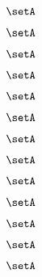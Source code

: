 \begin{forslides}
    \begin{equation}
        \label{eq:slides-processes-96}
        \setA
    \end{equation}

    \begin{equation}
        \label{eq:slides-processes-97}
        \setA
    \end{equation}

    \begin{equation}
        \label{eq:slides-processes-98}
        \setA
    \end{equation}

    \begin{equation}
        \label{eq:slides-processes-99}
        \setA
    \end{equation}
    
    \begin{equation}
        \label{eq:slides-processes-100}
        \setA
    \end{equation}

    \begin{equation}
        \label{eq:slides-processes-111}
        \setA
    \end{equation}

    \begin{equation}
        \label{eq:slides-processes-112}
        \setA
    \end{equation}

    \begin{equation}
        \label{eq:slides-processes-113}
        \setA
    \end{equation}

    \begin{equation}
        \label{eq:slides-processes-114}
        \setA
    \end{equation}

    \begin{equation}
        \label{eq:slides-processes-115}
        \setA
    \end{equation}

    \begin{equation}
        \label{eq:slides-processes-116}
        \setA
    \end{equation}

    \begin{equation}
        \label{eq:slides-processes-117}
        \setA
    \end{equation}

    \begin{equation}
        \label{eq:slides-processes-118}
        \setA
    \end{equation}


\end{forslides}
